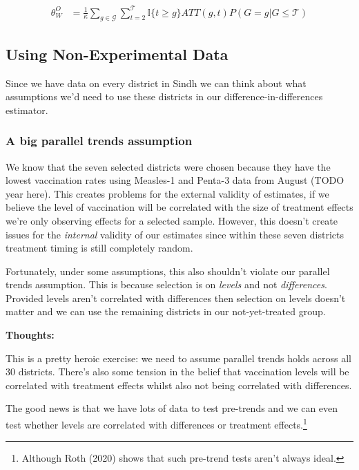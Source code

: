 \documentclass{article}
\begin{document}
   \begin{align*}
      \theta_W^O &= \frac{1}{\kappa} \sum_{g \in \mathcal{G}} \sum_{t=2}^\mathcal{T} 
      \mathbb{I}\{t \geq g\} ATT(g,t) P(G = g | G \leq \mathcal{T})
   \end{align*}



   \subsection*{Using Non-Experimental Data}

   Since we have data on every district in Sindh we can think about what assumptions 
   we'd need to use these districts in our difference-in-differences estimator.

   \subsubsection*{A big parallel trends assumption}
   We know that the seven selected districts were chosen because they have the 
   lowest vaccination rates using Measles-1 and Penta-3 data from August (TODO year here). This 
   creates problems for the external validity of estimates, if we believe 
   the level of vaccination will be correlated with the size of treatment effects 
   we're only observing effects for a selected sample. However, this doesn't create 
   issues for the \textit{internal} validity of our estimates since within these 
   seven districts treatment timing is still completely random.

   Fortunately, under some assumptions, this also shouldn't violate  our 
   parallel trends assumption. This 
   is because selection is on \textit{levels} and not \textit{differences}.  
   Provided levels aren't correlated with differences then selection on levels 
   doesn't matter and we can use the remaining districts in our not-yet-treated 
   group.

   \textbf{Thoughts:}

   This is a pretty heroic exercise: we need to assume parallel trends holds across 
   all 30 districts. There's also some tension in the belief that vaccination 
   levels will be correlated with treatment effects whilst also not being correlated 
   with differences.


   The good news is that we have lots of data to test pre-trends and we can even 
   test whether levels are correlated with differences or treatment effects.\footnote{Although 
   Roth (2020) shows that such pre-trend tests aren't always ideal.}
\end{document}
